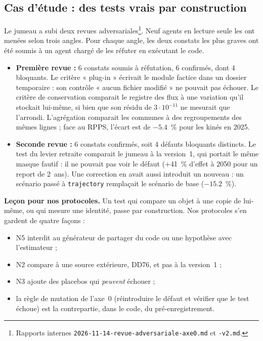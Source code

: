 \documentclass[11pt]{article}
\begin{document}
\subsection{Cas d'étude : des tests vrais par construction}
Le jumeau a subi deux revues adversariales\footnote{Rapports internes
\texttt{2026-11-14-revue-adversariale-axe0.md} et \texttt{-v2.md}.}. Neuf agents en lecture seule
les ont menées selon trois angles. Pour chaque angle, les deux constats les plus graves ont été
soumis à un agent chargé de les réfuter en exécutant le code.
\begin{itemize}
  \item \textbf{Première revue :} 6\mesure{} constats soumis à réfutation, 6 confirmés, dont
        4 bloquants. Le critère « plug-in » écrivait le module factice dans un dossier temporaire :
        son contrôle « aucun fichier modifié » ne pouvait pas échouer. Le critère de conservation
        comparait le registre des flux à une variation qu'il stockait lui-même, si bien que son
        résidu de $3 \cdot 10^{-11}$ ne mesurait que l'arrondi. L'agrégation comparait les communes
        à des regroupements des mêmes lignes ; face au RPPS, l'écart est de
        $-\num{5.4}$\mesure{}~\% pour les kinés en 2025.
  \item \textbf{Seconde revue :} 6\mesure{} constats confirmés, soit 4 défauts bloquants
        distincts. Le test du levier retraite comparait le jumeau à la version~1, qui portait le
        même masque fautif : il ne pouvait pas voir le défaut (+41\mesure{}~\% d'effet à 2050 pour un
        report de 2~ans). Une correction en avait aussi introduit un nouveau : un scénario passé à
        \texttt{trajectory} remplaçait le scénario de base ($-\num{15.2}$\mesure{}~\%).
\end{itemize}
\textbf{Leçon pour nos protocoles.} Un test qui compare un objet à une copie de lui-même, ou qui
mesure une identité, passe par construction. Nos protocoles s'en gardent de quatre façons :
\begin{itemize}
  \item N5 interdit au générateur de partager du code ou une hypothèse avec l'estimateur ;
  \item N2 compare à une source extérieure, DD76, et pas à la version~1 ;
  \item N3 ajoute des placebos qui \emph{peuvent} échouer ;
  \item la règle de mutation de l'axe~0 (réintroduire le défaut et vérifier que le test échoue)
        est la contrepartie, dans le code, du pré-enregistrement.
\end{itemize}
\end{document}
